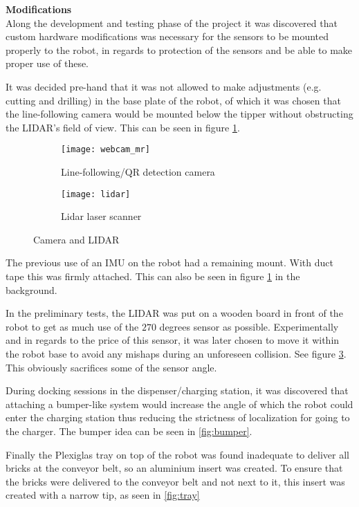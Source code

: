 \textbf{Modifications}\\
Along the development and testing phase of the project it was discovered that custom hardware modifications was necessary for the sensors to be mounted properly to the robot, in regards to protection of the sensors and be able to make proper use of these.

It was decided pre-hand that it was not allowed to make adjustments (e.g. cutting and drilling) in the base plate of the robot, of which it was chosen that the line-following camera would be mounted below the tipper without obstructing the LIDAR's field of view. This can be seen in figure \ref{fig:webcam_mr}.

  	\begin{figure}[H]
        \centering
        \begin{subfigure}{0.48\textwidth}
			\texttt{[image: webcam\_mr]}
			\caption{Line-following/QR detection camera}
			\label{fig:webcam_mr}
        \end{subfigure}
        \hspace{10pt}
        \begin{subfigure}{0.48\textwidth}
			\texttt{[image: lidar]}
			\caption{Lidar laser scanner}
			\label{fig:lidar}
    \end{subfigure}
    \caption{Camera and LIDAR}
    \end{figure}
	
The previous use of an IMU on the robot had a remaining mount. With duct tape this was firmly attached. This can also be seen in figure \ref{fig:webcam_mr} in the background.

In the preliminary tests, the LIDAR was put on a wooden board in front of the robot to get as much use of the $270$ degrees sensor as possible. 
Experimentally and in regards to the price of this sensor, it was later chosen to move it within the robot base to avoid any mishaps during an unforeseen collision. See figure \ref{fig:lidar}. This obviously sacrifices some of the sensor angle.

During docking sessions in the dispenser/charging station, it was discovered that attaching a bumper-like system would increase the angle of which the robot could enter the charging station thus reducing the strictness of localization for going to the charger. The bumper idea can be seen in \ref{fig:bumper}.  

Finally the Plexiglas tray on top of the robot was found inadequate to deliver all bricks at the conveyor belt, so an aluminium insert was created. To ensure that the bricks were delivered to the conveyor belt and not next to it, this insert was created with a narrow tip, as seen in \ref{fig:tray}

